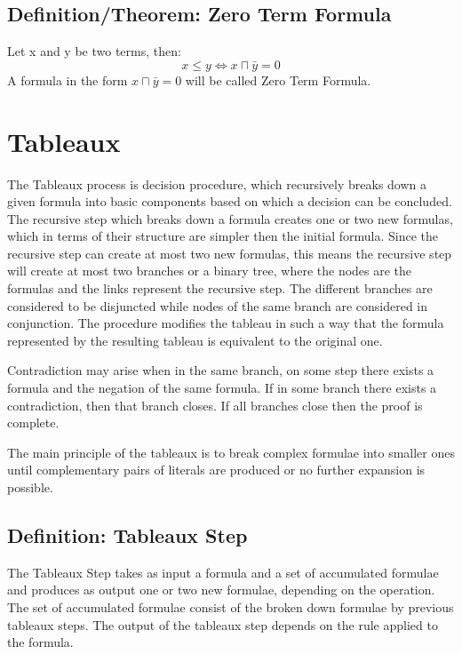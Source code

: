 \documentclass{article}
\begin{document}
		\subsection{Definition/Theorem: Zero Term Formula}
			Let x and y be two terms, then:
			\begin{equation}
				x \le y  \iff x \sqcap \bar{y} = 0
			\end{equation}
			A formula in the form $x \sqcap \bar{y} = 0$ will be called Zero Term Formula.

	\section{Tableaux}
	The Tableaux process is decision procedure, which recursively breaks down a given formula into basic components 
	based on which a decision can be concluded. The recursive step which breaks down a formula creates one or two 
	new formulas, which in terms of their structure are simpler then the initial formula. Since the recursive step can create
	at most two new formulas, this means the recursive step will create at most two branches or a binary tree, where the nodes
	are the formulas and the links represent the recursive step. The different branches are considered to be disjuncted while
   	nodes of the same branch are considered in conjunction. The procedure modifies the tableau in such a way that the 
	formula represented by the resulting tableau is equivalent to the original one.

	Contradiction may arise when in the same branch, on some step there exists a formula and the negation of the same formula.
	If in some branch there exists a contradiction, then that branch closes. If all branches close then the proof is complete.
	
	The main principle of the tableaux is to break complex formulae into smaller ones until complementary pairs of literals are
	produced or no further expansion is possible.

	\subsection{Definition: Tableaux Step}
		The Tableaux Step takes as input a formula and a set of accumulated formulae and produces as 
		output one or two new formulae, depending on the operation. 
		The set of accumulated formulae consist of the broken down formulae by previous tableaux steps.
		The output of the tableaux step depends on the rule applied to the formula.
\end{document}
